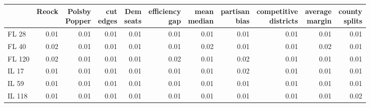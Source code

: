 \begin{tabular}{lrrrrrrrrrr}
\toprule
{} &  Reock &  \makecell{Polsby \\ Popper} &  \makecell{cut \\ edges} &  \makecell{Dem \\ seats} &  \makecell{efficiency \\ gap} &  \makecell{mean \\ median} &  \makecell{partisan \\ bias} &  \makecell{competitive \\ districts} &  \makecell{average \\ margin} &  \makecell{county \\ splits} \\
\midrule
FL 28  &   0.01 &                         0.01 &                     0.01 &                     0.01 &                          0.01 &                       0.01 &                         0.01 &                                 0.01 &                          0.01 &                         0.01 \\
FL 40  &   0.02 &                         0.01 &                     0.01 &                     0.01 &                          0.01 &                       0.02 &                         0.01 &                                 0.01 &                          0.02 &                         0.01 \\
FL 120 &   0.02 &                         0.01 &                     0.01 &                     0.01 &                          0.02 &                       0.01 &                         0.02 &                                 0.01 &                          0.01 &                         0.01 \\
IL 17  &   0.01 &                         0.01 &                     0.01 &                     0.01 &                          0.01 &                       0.01 &                         0.02 &                                 0.01 &                          0.01 &                         0.01 \\
IL 59  &   0.01 &                         0.01 &                     0.01 &                     0.01 &                          0.01 &                       0.01 &                         0.01 &                                 0.01 &                          0.01 &                         0.01 \\
IL 118 &   0.01 &                         0.01 &                     0.01 &                     0.01 &                          0.01 &                       0.01 &                         0.01 &                                 0.01 &                          0.01 &                         0.02 \\

\end{tabular}
